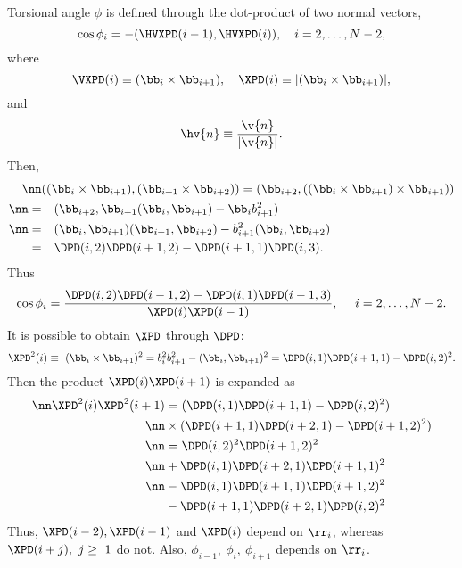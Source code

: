 Torsional angle $\phi$ is defined through the dot-product of two normal vectors,
\begin{equation}
  \cos\phi_{i}=-(\HVXPD(i-1),\HVXPD(i)),\quad i=2,\ldots,N-2,
\end{equation}
where
\begin{equation}
\VXPD(i)\equiv (\bb_i\times\bb_{i+1}),\quad
\XPD(i)\equiv|(\bb_i\times\bb_{i+1})|,
\end{equation}
and
\begin{equation}
  \hv{n}\equiv \frac{\v{n}}{|\v{n}|}.
\end{equation}
Then,
\begin{align}
\nn&((\bb_i\times\bb_{i+1}),(\bb_{i+1}\times\bb_{i+2}))=
(\bb_{i+2},((\bb_i\times\bb_{i+1})\times\bb_{i+1}))\\
\nn=&\quad(\bb_{i+2},\bb_{i+1}(\bb_i,\bb_{i+1})-\bb_ib_{i+1}^2)\\
\nn=&\quad(\bb_i,\bb_{i+1})(\bb_{i+1},\bb_{i+2})-b_{i+1}^2(\bb_i,\bb_{i+2})\\
=&\quad\DPD(i,2)\DPD(i+1,2)-\DPD(i+1,1)\DPD(i,3).
\end{align}
Thus
\begin{equation}
  \cos\phi_{i}=\frac{\DPD(i,2)\DPD(i-1,2)-\DPD(i,1)\DPD(i-1,3)}{\XPD(i)\XPD(i-1)},
  \quad\ i=2,\ldots,N-2.
  \label{bln-def-tangle}
\end{equation}
It is possible to obtain $\XPD$ through $\DPD$:
\begin{equation}
  \XPD^2(i)\equiv\ (\bb_i\times\bb_{i+1})^2
  =b_i^2b_{i+1}^2-(\bb_i,\bb_{i+1})^2
  =\DPD(i,1)\DPD(i+1,1)-\DPD(i,2)^2.
\end{equation}
Then the product $\XPD(i)\XPD(i+1)$ is expanded as
\begin{align}
  \nn\XPD^2(i)\XPD^2(i+1)&={(\DPD(i,1)\DPD(i+1,1)-\DPD(i,2)^2)}\\
  \nn&\times{(\DPD(i+1,1)\DPD(i+2,1)-\DPD(i+1,2)^2)}\\
  \nn&=\DPD(i,2)^2\DPD(i+1,2)^2\\
  \nn&+\DPD(i,1)\DPD(i+2,1)\DPD(i+1,1)^2\\
  \nn&-\DPD(i,1)\DPD(i+1,1)\DPD(i+1,2)^2\\
  &-\DPD(i+1,1)\DPD(i+2,1)\DPD(i,2)^2
\end{align}
Thus, $\XPD(i-2),\XPD(i-1)$ and $\XPD(i)$ depend on $\rr_i$, 
whereas $\XPD(i+j),\ j\ge\ 1$ do not. 
Also, $\phi_{i-1},\ \phi_i,\ \phi_{i+1}$ depends on $\rr_i$. 

